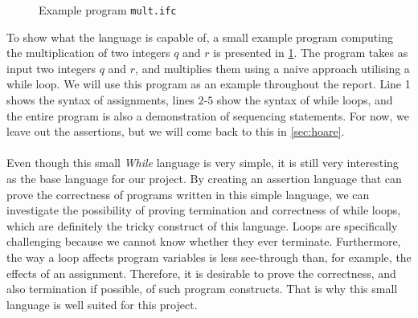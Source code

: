 \begin{figure}[h]

\caption{Example program \texttt{mult.ifc}}
\label{figure:basicmult}
\end{figure}

To show what the language is capable of, a small example program computing the multiplication of two integers $q$ and $r$ is presented in \cref{figure:basicmult}. 
The program takes as input two integers $q$ and $r$, and multiplies them using a naive approach utilising a while loop.
We will use this program as an example throughout the report.
Line 1 shows the syntax of assignments, lines $2$-$5$ show the syntax of while loops, and the entire program is also a demonstration of sequencing statements.
For now, we leave out the assertions, but we will come back to this in \cref{sec:hoare}.
\\~\\
Even though this small \textit{While} language is very simple, it is still very interesting as the base language for our project.
By creating an assertion language that can prove the correctness of programs written in this simple language, we can investigate the possibility of proving termination and correctness of while loops, which are definitely the tricky construct of this language.
Loops are specifically challenging because we cannot know whether they ever terminate. Furthermore, the way a loop affects program variables is less see-through than, for example, the effects of an assignment.
Therefore, it is desirable to prove the correctness, and also termination if possible, of such program constructs. That is why this small language is well suited for this project.
